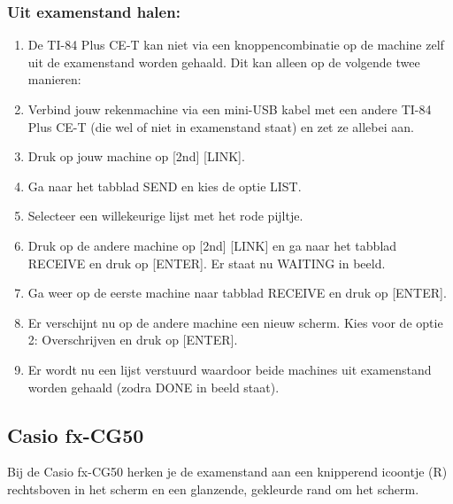 \documentclass{article}
\begin{document}
    \subsubsection*{Uit examenstand halen:}
    \begin{enumerate}
        \item De TI-84 Plus CE-T kan niet via een knoppencombinatie op de machine zelf uit de examenstand worden gehaald. Dit kan alleen op de volgende twee manieren:
        \item Verbind jouw rekenmachine via een mini-USB kabel met een andere TI-84 Plus CE-T (die wel of niet in examenstand staat) en zet ze allebei aan.
        \item Druk op jouw machine op [2nd] [LINK].
        \item Ga naar het tabblad SEND en kies de optie LIST.
        \item Selecteer een willekeurige lijst met het rode pijltje.
        \item Druk op de andere machine op [2nd] [LINK] en ga naar het tabblad RECEIVE en druk op [ENTER]. Er staat nu WAITING in beeld.
        \item Ga weer op de eerste machine naar tabblad RECEIVE en druk op [ENTER].
        \item Er verschijnt nu op de andere machine een nieuw scherm. Kies voor de optie 2: Overschrijven en druk op [ENTER].
        \item Er wordt nu een lijst verstuurd waardoor beide machines uit examenstand worden gehaald (zodra DONE in beeld staat).
    \end{enumerate}

    \subsection*{Casio fx-CG50}
    Bij de Casio fx-CG50 herken je de examenstand aan een knipperend icoontje (R) rechtsboven in het scherm en een glanzende, gekleurde rand om het scherm.
\end{document}
